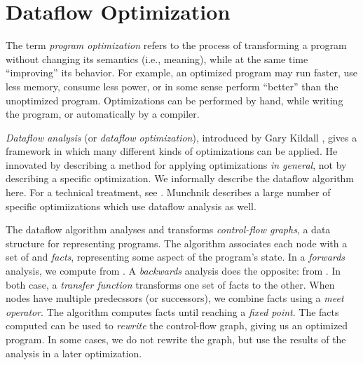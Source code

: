 \documentclass[12pt]{report}
\begin{document}

\renewcommand{\textfraction}{0.1}
\renewcommand{\topfraction}{0.9}

\chapter{Dataflow Optimization}
\label{ref_chapter_background}



The term \emph{program optimization} refers to the process of
transforming a program without changing its semantics (i.e., meaning),
while at the same time ``improving'' its behavior.  For example, an
optimized program may run faster, use less memory, consume less power,
or in some sense perform ``better'' than the unoptimized
program. Optimizations can be performed by hand, while writing
the program, or automatically by a compiler. 

\emph{Dataflow analysis} (or \emph{dataflow optimization}), introduced
by Gary Kildall \citep{Kildall1973}, gives a framework in which many
different kinds of optimizations can be applied. He innovated by
describing a method for applying optimizations \emph{in general}, not
by describing a specific optimization.  We informally describe the
dataflow algorithm here. For a technical treatment, see
\citep{AhoXX}. Munchnik \citep{MunchXX} describes a large number of
specific optimiizations which use dataflow analysis as well.

The dataflow algorithm analyses and transforms \emph{control-flow graphs}, a
data structure for representing programs. The algorithm associates each
node with a set of \inE and \out \emph{facts}, representing some
aspect of the program's state. In a \emph{forwards} analysis, we
compute \out from \inE. A \emph{backwards} analysis does the opposite:
\inE from \out.  In both case, a \emph{transfer function} transforms
one set of facts to the other. When nodes have multiple predecssors
(or successors), we combine facts using a \emph{meet operator}. The
algorithm computes facts until reaching a \emph{fixed point}. The
facts computed can be used to \emph{rewrite} the control-flow graph,
giving us an optimized program. In some cases, we do not rewrite the
graph, but use the results of the analysis in a later optimization.
\end{document}
